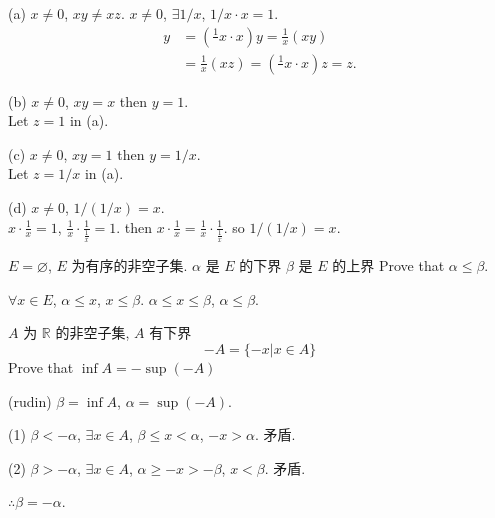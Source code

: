 \begin{mySolve}
    (a) $x \neq 0$, $xy \neq xz$. $x \neq 0$, $\exists 1/x$, $1/x\cdot x = 1$.
    \begin{align*}
        y & = \left(\frac{1}{}x \cdot x\right) y = \frac{1}{x}(xy)\\
        &=\frac{1}{x}(xz) = \left(\frac{1}{}x \cdot x\right) z = z.
    \end{align*}

    (b) $x \neq 0$, $xy = x$ then $y = 1$.\\
    Let $z = 1$ in (a).

    (c) $x \neq 0$, $xy = 1$ then $y = 1/x$.\\
    Let $z = 1/x$ in (a).

    (d) $x \neq 0$, $1/(1/x) = x$.\\
    $x\cdot \frac{1}{x} = 1$, $\frac{1}{x} \cdot \frac{1}{\frac{1}{x}} = 1$.
    then $x\cdot \frac{1}{x} = \frac{1}{x} \cdot \frac{1}{\frac{1}{x}}$.
    so $1/(1/x) = x$.
\end{mySolve}

\begin{myExercise}
    $E = \varnothing$, $E$ 为有序的非空子集.
    $\alpha$ 是 $E$ 的下界
    $\beta$ 是 $E$ 的上界
    Prove that $\alpha \leq \beta$.
\end{myExercise}

\begin{mySolve}
   $\forall x\in E$, $\alpha \leq x$, $x\leq \beta$.
   $\alpha \leq x \leq \beta$, $\alpha \leq \beta$.
\end{mySolve}

\begin{myExercise}
    $A$ 为 $\mathbb{R}$ 的非空子集, $A$ 有下界
    \begin{equation*}
        -A = \{-x|x\in A\}
    \end{equation*}
    Prove that $\inf A = -\sup (-A)$
\end{myExercise}

\begin{mySolve}(rudin)
    $\beta = \inf A$, $\alpha = \sup (-A)$.

    (1) $\beta < -\alpha$, $\exists x\in A$, $\beta \leq x < \alpha$, $-x > \alpha$. 矛盾.
    
    (2) $\beta > -\alpha$, $\exists x\in A$, $\alpha \geq -x > -\beta$, $x < \beta$. 矛盾.

    $\therefore \beta = -\alpha$.
\end{mySolve}


